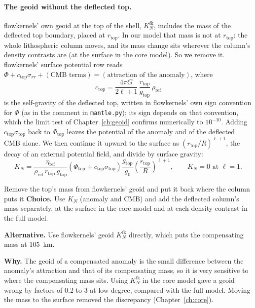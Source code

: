 \paragraph{The geoid without the deflected top.}
flowkernels' own geoid at the top of the shell, $K_N^{\mathrm{fk}}$, includes the mass of the deflected top boundary, placed at $r_{\mathrm{top}}$.
In our model that mass is not at $r_{\mathrm{top}}$: the whole lithospheric column moves, and its mass change sits wherever the column's density contrasts are (at the surface in the core model).
So we remove it.
flowkernels' surface potential row reads $\Phi + c_{\mathrm{top}}\sigma_{rr} + (\text{CMB terms}) = (\text{attraction of the anomaly})$, where
\begin{equation}
    c_{\mathrm{top}} = \frac{4\pi G}{2\ell+1}\,\frac{r_{\mathrm{top}}}{g_{\mathrm{top}}}\,\rho_{\mathrm{ref}}
\end{equation}
is the self-gravity of the deflected top, written in flowkernels' own sign convention for $\Phi$ (as in the comment in \texttt{mantle.py}); its sign depends on that convention, which the limit test of Chapter~\ref{ch:geoid} confirms numerically to $10^{-10}$.
Adding $c_{\mathrm{top}}\sigma_{\mathrm{top}}$ back to $\Phi_{\mathrm{top}}$ leaves the potential of the anomaly and of the deflected CMB alone.
We then continue it upward to the surface as $(r_{\mathrm{top}}/R)^{\ell+1}$, the decay of an external potential field, and divide by surface gravity:
\begin{equation}
    K_N = \frac{\eta_{\mathrm{ref}}}{\rho_{\mathrm{ref}}\,r_{\mathrm{top}}\,g_{\mathrm{top}}}
    \left(\Phi_{\mathrm{top}} + c_{\mathrm{top}}\sigma_{\mathrm{top}}\right)
    \frac{g_{\mathrm{top}}}{g_0}\left(\frac{r_{\mathrm{top}}}{R}\right)^{\ell+1},
    \qquad K_N = 0 \text{ at } \ell=1 .
\end{equation}

\begin{decision}{Remove the top's mass from flowkernels' geoid and put it back where the column puts it}
\textbf{Choice.} Use $K_N$ (anomaly and CMB) and add the deflected column's mass separately, at the surface in the core model and at each density contrast in the full model.

\textbf{Alternative.} Use flowkernels' geoid $K_N^{\mathrm{fk}}$ directly, which puts the compensating mass at \qty{105}{km}.

\textbf{Why.} The geoid of a compensated anomaly is the small difference between the anomaly's attraction and that of its compensating mass, so it is very sensitive to where the compensating mass sits.
Using $K_N^{\mathrm{fk}}$ in the core model gave a geoid wrong by factors of 0.2 to 3 at low degree, compared with the full model.
Moving the mass to the surface removed the discrepancy (Chapter~\ref{ch:core}).
\end{decision}

